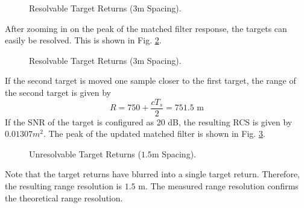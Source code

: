 \documentclass[conference]{IEEEtran}
\begin{document}
\begin{figure}[H]
\centerline{}
\caption{Resolvable Target Returns ($3$m Spacing).}
\label{resolvable_full}
\end{figure}
\noindent
After zooming in on the peak of the matched filter response, the targets can easily be resolved. This is shown in Fig. \ref{resolvable_peak}.
\begin{figure}[H]
\centerline{}
\caption{Resolvable Target Returns ($3$m Spacing).}
\label{resolvable_peak}
\end{figure}
\par
If the second target is moved one sample closer to the first target, the range of the second target is given by 
\begin{equation}
R = 750 + \frac{cT_s}{2} = 751.5 \text{ m}
\end{equation}
If the SNR of the target is configured as 20 dB, the resulting RCS is given by $0.01307m^2$. The peak of the updated matched filter is shown in Fig. \ref{unresolvable_peak}.
\begin{figure}[H]
\centerline{}
\caption{Unresolvable Target Returns ($1.5$m Spacing).}
\label{unresolvable_peak}
\end{figure}
\par
Note that the target returns have blurred into a single target return. Therefore, the resulting range resolution is $1.5 \text{ m}$. The measured range resolution confirms the theoretical range resolution.
% 
\end{document}
